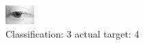 \begin{figure}[h!]
\begin{center}
\includegraphics[width=0.60\columnwidth]{figures/ID2648_class_3_target_4.png}
\end{center}
\caption{ Classification: 3 actual target: 4}
\label{fig:ID2648_class_3_target_4}
\end{figure}
